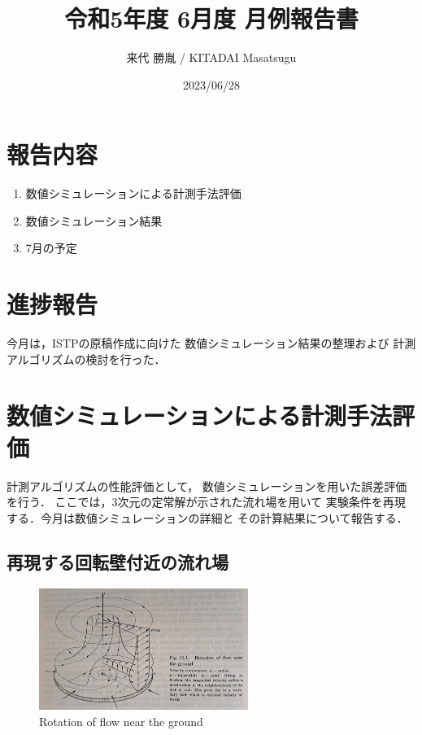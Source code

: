 \documentclass[twocolumn,a4j]{jsarticle}
\author{来代 勝胤 / KITADAI Masatsugu}
\title{令和5年度 6月度 月例報告書}
\date{2023/06/28}
\begin{document}
\columnseprule=0.1mm
\maketitle

\section*{報告内容}
\begin{enumerate}[1.]
  \item 数値シミュレーションによる計測手法評価
  \item 数値シミュレーション結果
  \item 7月の予定
\end{enumerate}

\section*{進捗報告}
今月は，ISTPの原稿作成に向けた
数値シミュレーション結果の整理および
計測アルゴリズムの検討を行った．

\section{数値シミュレーションによる計測手法評価}
計測アルゴリズムの性能評価として，
数値シミュレーションを用いた誤差評価を行う．
ここでは，3次元の定常解が示された流れ場を用いて
実験条件を再現する．今月は数値シミュレーションの詳細と
その計算結果について報告する．\\

\subsection{再現する回転壁付近の流れ場}
\begin{figure}[htbp]
  \footnotesize
  \begin{center}
    \includegraphics[width=68mm]{../images/Boundary-Layer_Theory_Fig.11.1.jpg}
    \caption{Rotation of flow near the ground}
  \end{center}
\end{figure}
\end{document}
